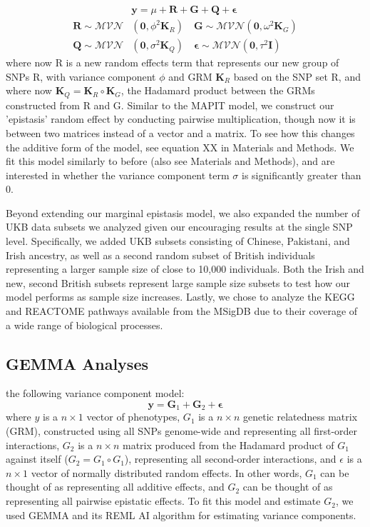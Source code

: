 \documentclass[12pt,a4paper]{article}
\begin{document}
\begin{align}
    & \textbf{y} = \mu + \textbf{R} + \textbf{G} + \textbf{Q} + \boldsymbol{\epsilon} \\
    \textbf{R} \sim \mathcal{MVN}&(\textbf{0}, \phi^{2}\textbf{K}_R) \quad \textbf{G} \sim \mathcal{MVN}(\textbf{0}, \omega^{2}\textbf{K}_G) \nonumber \\ 
    \textbf{Q} \sim \mathcal{MVN}&(\textbf{0}, \sigma^{2}\textbf{K}_Q) \quad \boldsymbol{\epsilon} \sim \mathcal{MVN}(\textbf{0}, \tau^{2}\textbf{I}) \nonumber 
\end{align}
where now R is a new random effects term that represents our new group of SNPs R, with variance component $\phi$ and GRM $\textbf{K}_R$ based on the SNP set R, and where now $\textbf{K}_Q = \textbf{K}_R \circ \textbf{K}_G$, the Hadamard product between the GRMs constructed from R and G. Similar to the MAPIT model, we construct our 'epistasis' random effect by conducting pairwise multiplication, though now it is between two matrices instead of a vector and a matrix. To see how this changes the additive form of the model, see equation XX in Materials and Methods. We fit this model similarly to before (also see Materials and Methods), and are interested in whether the variance component term $\sigma$ is significantly greater than 0.


Beyond extending our marginal epistasis model, we also expanded the number of UKB data subsets we analyzed given our encouraging results at the single SNP level. Specifically, we added UKB subsets consisting of Chinese, Pakistani, and Irish ancestry, as well as a second random subset of British individuals representing a larger sample size of close to 10,000 individuals. Both the Irish and new, second British subsets represent large sample size subsets to test how our model performs as sample size increases. Lastly, we chose to analyze the KEGG and REACTOME pathways available from the MSigDB \citep{Liberzon2011} due to their coverage of a wide range of biological processes. 




\subsection{GEMMA Analyses}

 the following variance component model:
\begin{equation}\label{InterPath-GEMMA-Equation-Model}
 \textbf{y} = \textbf{G}_1 + \textbf{G}_2 + \boldsymbol{\epsilon}
\end{equation}
where $y$ is a $n \times 1$ vector of phenotypes, $G_1$ is a $n \times n$ genetic relatedness matrix (GRM), constructed using all SNPs genome-wide and representing all first-order interactions, $G_2$ is a $n \times n$ matrix produced from the Hadamard product of $G_1$ against itself ($G_2 = G_1 \circ G_1$), representing all second-order interactions, and $\epsilon$ is a $n \times 1$ vector of normally distributed random effects. In other words, $G_1$ can be thought of as representing all additive effects, and $G_2$ can be thought of as representing all pairwise epistatic effects. To fit this model and estimate $G_2$, we used GEMMA \citep{Zhou2012} and its REML AI algorithm for estimating variance components.
\end{document}
